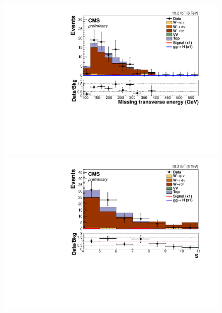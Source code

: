 \begin{figure}
  \includegraphics[width=.65\largefigwidth]{plots/parked/HIG-14-038-figs/output_sigreg/taunu_metnomuons.pdf}
  \includegraphics[width=.65\largefigwidth]{plots/parked/HIG-14-038-figs/output_sigreg/taunu_metnomu_significance.pdf}


\end{figure}

